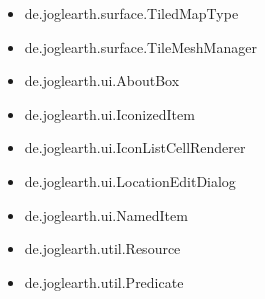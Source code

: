 \documentclass[10pt]{scrreprt}
\begin{document}
\begin{itemize}
\item de.joglearth.surface.TiledMapType
\item de.joglearth.surface.TileMeshManager
\item de.joglearth.ui.AboutBox
\item de.joglearth.ui.IconizedItem
\item de.joglearth.ui.IconListCellRenderer
\item de.joglearth.ui.LocationEditDialog
\item de.joglearth.ui.NamedItem
\item de.joglearth.util.Resource
\item de.joglearth.util.Predicate
\end{itemize}
\end{document}

